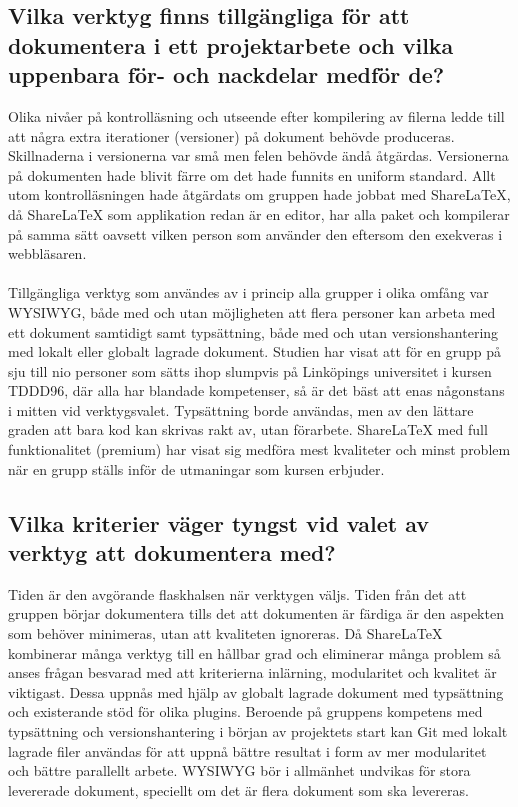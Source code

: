 \subsection{Vilka verktyg finns tillgängliga för att dokumentera i ett projektarbete och vilka uppenbara för- och nackdelar medför de?}
Olika nivåer på kontrolläsning och utseende efter kompilering av filerna ledde till att några extra iterationer (versioner) på dokument behövde produceras. Skillnaderna i versionerna var små men felen behövde ändå åtgärdas. Versionerna på dokumenten hade blivit färre om det hade funnits en uniform standard. Allt utom kontrolläsningen hade åtgärdats om gruppen hade jobbat med ShareLaTeX, då ShareLaTeX som applikation redan är en editor, har alla paket och kompilerar på samma sätt oavsett vilken person som använder den eftersom den exekveras i webbläsaren.
\\ \\
Tillgängliga verktyg som användes av i princip alla grupper i olika omfång var WYSIWYG, både med och utan möjligheten att flera personer kan arbeta med ett dokument samtidigt samt typsättning, både med och utan versionshantering med lokalt eller globalt lagrade dokument. Studien har visat att för en grupp på sju till nio personer som sätts ihop slumpvis på Linköpings universitet i kursen TDDD96, där alla har blandade kompetenser, så är det bäst att enas någonstans i mitten vid verktygsvalet. Typsättning borde användas, men av den lättare graden att bara kod kan skrivas rakt av, utan förarbete. ShareLaTeX med full funktionalitet (premium) har visat sig medföra mest kvaliteter och minst problem när en grupp ställs inför de utmaningar som kursen erbjuder.

\subsection{Vilka kriterier väger tyngst vid valet av verktyg att dokumentera med?}
Tiden är den avgörande flaskhalsen när verktygen väljs. Tiden från det att gruppen börjar dokumentera tills det att dokumenten är färdiga är den aspekten som behöver minimeras, utan att kvaliteten ignoreras. Då ShareLaTeX kombinerar många verktyg till en hållbar grad och eliminerar många problem så anses frågan besvarad med att kriterierna inlärning, modularitet och kvalitet är viktigast. Dessa uppnås med hjälp av globalt lagrade dokument med typsättning och existerande stöd för olika plugins. Beroende på gruppens kompetens med typsättning och versionshantering i början av projektets start kan Git med lokalt lagrade filer användas för att uppnå bättre resultat i form av mer modularitet och bättre parallellt arbete. WYSIWYG bör i allmänhet undvikas för stora levererade dokument, speciellt om det är flera dokument som ska levereras.

